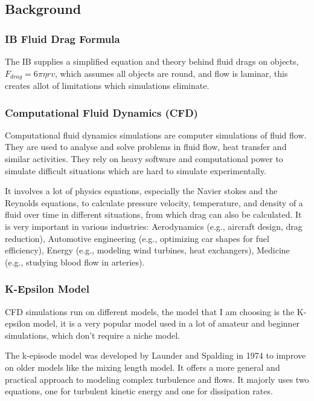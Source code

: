 \documentclass[12pt,a4paper]{article}
\begin{document}
\subsection{Background}

\subsubsection{IB Fluid Drag Formula}

The IB supplies a simplified equation and theory behind fluid drags on objects, $F_{drag} = 6\pi\eta rv$, which assumes all objects are round, and flow is laminar, this creates allot of limitations which simulations eliminate.

\subsubsection{Computational Fluid Dynamics (CFD)}

Computational fluid dynamics simulations are computer simulations of fluid flow. They are used to analyse and solve problems in fluid flow, heat transfer and similar activities. They rely on heavy software and computational power to simulate difficult situations which are hard to simulate experimentally. 

It involves a lot of physics equations, especially the Navier stokes and the Reynolds equations, to calculate pressure velocity, temperature, and density of a fluid over time in different situations, from which drag can also be calculated. It is very important in various industries: Aerodynamics (e.g., aircraft design, drag reduction), Automotive engineering (e.g., optimizing car shapes for fuel efficiency), Energy (e.g., modeling wind turbines, heat exchangers), Medicine (e.g., studying blood flow in arteries).

\subsubsection{K-Epsilon Model}

CFD simulations run on different models, the model that I am choosing is the K-epsilon model, it is a very popular model used in a lot of amateur and beginner simulations, which don't require a niche model.

The k-episode model was developed by Launder and Spalding in 1974 to improve on older models like the mixing length model. It offers a more general and practical approach to modeling complex turbulence and flows. It majorly uses two equations, one for turbulent kinetic energy and one for dissipation rates.
\end{document}
